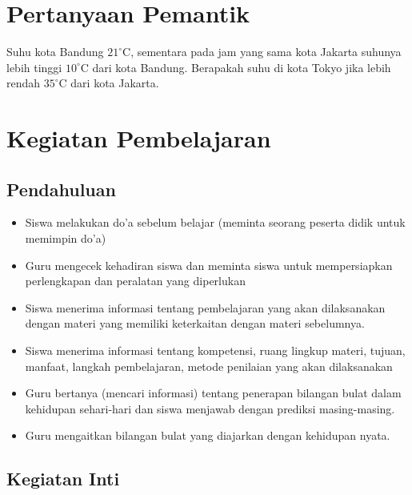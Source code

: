 \documentclass[a5paper,10pt,openany]{book}
\begin{document}
\section{Pertanyaan Pemantik}

{\color{NavyBlue}Suhu kota Bandung $21^\circ$C, sementara pada jam yang sama kota Jakarta suhunya lebih tinggi $10^\circ$C dari kota Bandung. Berapakah suhu di kota Tokyo jika lebih rendah $35^\circ$C dari kota Jakarta.}

\section{Kegiatan Pembelajaran}
\subsection*{Pendahuluan}
{\color{NavyBlue}

\begin{itemize}[\faCheckSquare,leftmargin=*,itemsep=-4pt,topsep=2pt]
\item Siswa melakukan do’a sebelum belajar (meminta seorang peserta didik untuk memimpin do’a) 
\item Guru mengecek kehadiran siswa dan meminta siswa untuk mempersiapkan perlengkapan dan peralatan yang diperlukan
\item Siswa menerima informasi tentang pembelajaran yang akan dilaksanakan dengan materi yang memiliki keterkaitan dengan materi sebelumnya.
\item Siswa menerima informasi tentang kompetensi, ruang lingkup materi, tujuan, manfaat, langkah pembelajaran, metode penilaian yang akan dilaksanakan 
\item Guru bertanya (mencari informasi) tentang penerapan bilangan bulat dalam kehidupan sehari-hari dan siswa menjawab dengan prediksi masing-masing.
\item Guru mengaitkan bilangan bulat yang diajarkan dengan kehidupan nyata.
\end{itemize}	
}	
\subsection*{Kegiatan Inti}
\end{document}
